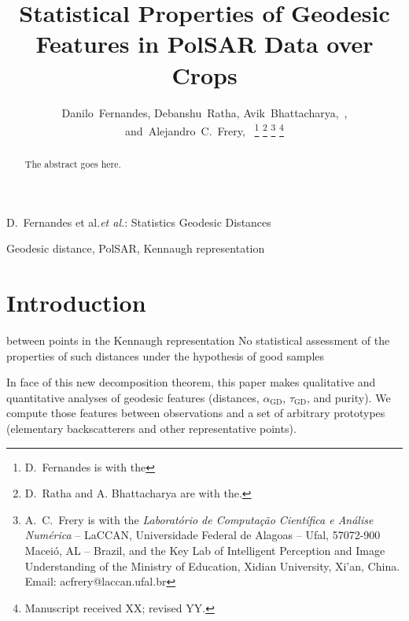 \documentclass[journal]{IEEEtran}
\begin{document}
\title{Statistical Properties of Geodesic Features in PolSAR Data over Crops}

\author{Danilo~Fernandes,
        Debanshu~Ratha,
        Avik~Bhattacharya,~,
        and~Alejandro~C.~Frery,~%
\thanks{D.\ Fernandes is with the}%
\thanks{D.\ Ratha and A. Bhattacharya are with the.}%
\thanks{A.\ C.\ Frery is with the \textit{Laborat\'orio de Computa\c c\~ao Cient\'ifica e An\'alise Num\'erica} -- LaCCAN, 
	Universidade Federal de Alagoas -- Ufal, 
	57072-900 Macei\'o, AL -- Brazil, and the Key Lab of Intelligent Perception and Image Understanding of the Ministry of Education, Xidian University, Xi'an, China. Email: acfrery@laccan.ufal.br}
\thanks{Manuscript received XX; revised YY.}}

%
{D.\ Fernandes et al.\MakeLowercase{\textit{et al.}}: Statistics Geodesic Distances}

\maketitle

\begin{abstract}
The abstract goes here.
\end{abstract}

\begin{IEEEkeywords}
Geodesic distance, PolSAR, Kennaugh representation
\end{IEEEkeywords}

\IEEEpeerreviewmaketitle



\section{Introduction}

 between points in the Kennaugh representation
No statistical assessment of the properties of such distances under the hypothesis of good samples

In face of this new decomposition theorem, this paper makes qualitative and quantitative analyses of geodesic features (distances, $\alpha_{\text{GD}}$, $\tau_{\text{GD}}$, and purity).
We compute those features between observations and a set of arbitrary prototypes (elementary backscatterers and other representative points).
\end{document}
